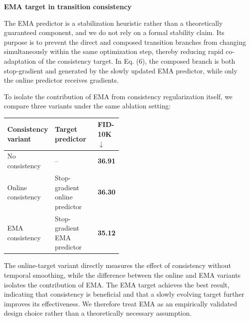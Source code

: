 \documentclass[10pt,letterpaper]{article}
\begin{document}
\begin{answerbox}

\textbf{EMA target in transition consistency}\par

The EMA predictor is a stabilization heuristic rather than a theoretically guaranteed component, and we do not rely on a formal stability claim. Its purpose is to prevent the direct and composed transition branches from changing simultaneously within the same optimization step, thereby reducing rapid co-adaptation of the consistency target. In Eq. (6), the composed branch is both stop-gradient and generated by the slowly updated EMA predictor, while only the online predictor receives gradients.\par

To isolate the contribution of EMA from consistency regularization itself, we compare three variants under the same ablation setting:\par

\begin{cleanTable}
\small
\begin{tabularx}{\linewidth}{>{\RaggedRight\arraybackslash}p{0.29\linewidth} Y >{\RaggedLeft\arraybackslash}p{0.18\linewidth}}
\bfseries\color{white} Consistency variant & \bfseries\color{white} Target predictor & \bfseries\color{white} FID-10K \(\downarrow\) \\
\midrule
No consistency & -- & \textcolor{todored}{\bfseries 36.91} \\
Online consistency & Stop-gradient online predictor & \textcolor{todored}{\bfseries 36.30} \\
EMA consistency & Stop-gradient EMA predictor & \textcolor{todored}{\bfseries 35.12} \\
\end{tabularx}
\end{cleanTable}

The online-target variant directly measures the effect of consistency without temporal smoothing, while the difference between the online and EMA variants isolates the contribution of EMA. The EMA target achieves the best result, indicating that consistency is beneficial and that a slowly evolving target further improves its effectiveness. We therefore treat EMA as an empirically validated design choice rather than a theoretically necessary assumption.\par

\end{answerbox}
\end{document}
